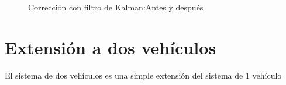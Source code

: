 \begin{figure}[!htb]
  \begin{center}
    \caption{Corrección con filtro de Kalman:Antes y después}
    \label{CorrciónUnicar}
  \end{center}
\end{figure}
\newpage

\section{Extensión a dos vehículos}
El sistema de dos vehículos es una simple extensión del sistema de 1 vehículo

